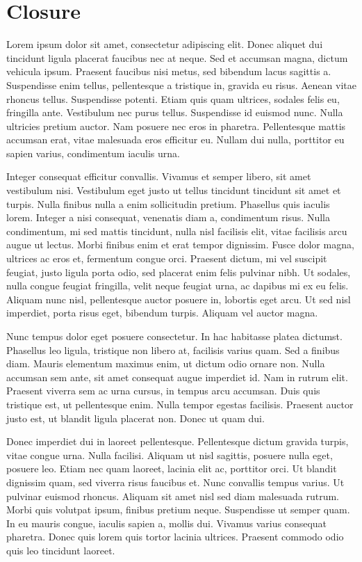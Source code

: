 \chapter{Closure}


Lorem ipsum dolor sit amet, consectetur adipiscing elit. Donec aliquet dui tincidunt ligula placerat faucibus nec at neque. Sed et accumsan magna, dictum vehicula ipsum. Praesent faucibus nisi metus, sed bibendum lacus sagittis a. Suspendisse enim tellus, pellentesque a tristique in, gravida eu risus. Aenean vitae rhoncus tellus. Suspendisse potenti. Etiam quis quam ultrices, sodales felis eu, fringilla ante. Vestibulum nec purus tellus. Suspendisse id euismod nunc. Nulla ultricies pretium auctor. Nam posuere nec eros in pharetra. Pellentesque mattis accumsan erat, vitae malesuada eros efficitur eu. Nullam dui nulla, porttitor eu sapien varius, condimentum iaculis urna.

Integer consequat efficitur convallis. Vivamus et semper libero, sit amet vestibulum nisi. Vestibulum eget justo ut tellus tincidunt tincidunt sit amet et turpis. Nulla finibus nulla a enim sollicitudin pretium. Phasellus quis iaculis lorem. Integer a nisi consequat, venenatis diam a, condimentum risus. Nulla condimentum, mi sed mattis tincidunt, nulla nisl facilisis elit, vitae facilisis arcu augue ut lectus. Morbi finibus enim et erat tempor dignissim. Fusce dolor magna, ultrices ac eros et, fermentum congue orci. Praesent dictum, mi vel suscipit feugiat, justo ligula porta odio, sed placerat enim felis pulvinar nibh. Ut sodales, nulla congue feugiat fringilla, velit neque feugiat urna, ac dapibus mi ex eu felis. Aliquam nunc nisl, pellentesque auctor posuere in, lobortis eget arcu. Ut sed nisl imperdiet, porta risus eget, bibendum turpis. Aliquam vel auctor magna.

Nunc tempus dolor eget posuere consectetur. In hac habitasse platea dictumst. Phasellus leo ligula, tristique non libero at, facilisis varius quam. Sed a finibus diam. Mauris elementum maximus enim, ut dictum odio ornare non. Nulla accumsan sem ante, sit amet consequat augue imperdiet id. Nam in rutrum elit. Praesent viverra sem ac urna cursus, in tempus arcu accumsan. Duis quis tristique est, ut pellentesque enim. Nulla tempor egestas facilisis. Praesent auctor justo est, ut blandit ligula placerat non. Donec ut quam dui.

Donec imperdiet dui in laoreet pellentesque. Pellentesque dictum gravida turpis, vitae congue urna. Nulla facilisi. Aliquam ut nisl sagittis, posuere nulla eget, posuere leo. Etiam nec quam laoreet, lacinia elit ac, porttitor orci. Ut blandit dignissim quam, sed viverra risus faucibus et. Nunc convallis tempus varius. Ut pulvinar euismod rhoncus. Aliquam sit amet nisl sed diam malesuada rutrum. Morbi quis volutpat ipsum, finibus pretium neque. Suspendisse ut semper quam. In eu mauris congue, iaculis sapien a, mollis dui. Vivamus varius consequat pharetra. Donec quis lorem quis tortor lacinia ultrices. Praesent commodo odio quis leo tincidunt laoreet.

